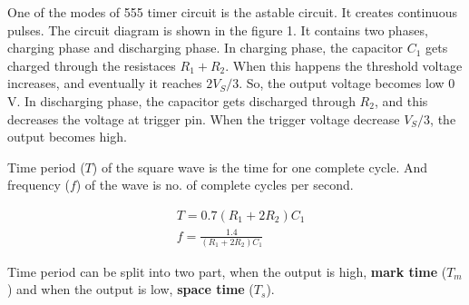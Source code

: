 \documentclass[12pt]{article}
\begin{document}
One of the modes of 555 timer circuit is the astable circuit. It creates continuous pulses. The circuit diagram is shown in the figure 1. It contains two phases, charging phase and discharging phase. In charging phase, the capacitor $C_1$ gets charged through the resistaces $R_1 + R_2$. When this happens the threshold voltage increases, and eventually it reaches $2 V_S/3$. So, the output voltage becomes low 0 V. In discharging phase, the capacitor gets discharged through $R_2$, and this decreases the voltage at trigger pin. When the trigger voltage decrease $V_S/3$, the output becomes high.

Time period ($T$) of the square wave is the time for one complete cycle. And frequency ($f$) of the wave is no. of complete cycles per second.

\begin{equation}
	\begin{split}
		&T = 0.7 (R_1 + 2 R_2) C_1 \\
		&f = \frac{1.4}{(R_1 + 2 R_2) C_1}
	\end{split}
\label{equation_1}
	\end{equation}

Time period can be split into two part, when the output is high, \textbf{mark time} ($T_m$) and when the output is low,  \textbf{space time} ($T_s$).
\end{document}
